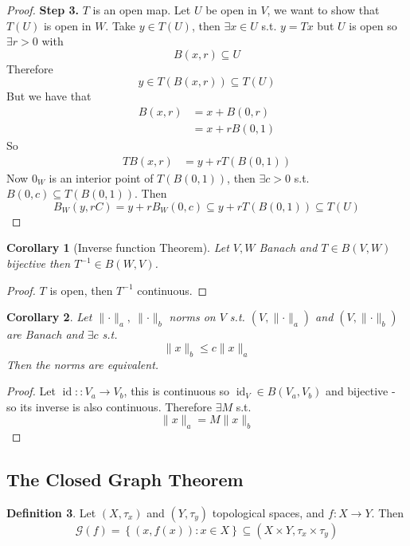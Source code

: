 \documentclass[11pt,a4paper]{article}
\theoremstyle{definition}
\newtheorem{definition}{Definition}[section]
\theoremstyle{plain}
\newtheorem{corollary}[definition]{Corollary}
\theoremstyle{remark}
\renewcommand{\set}[1]{\left\{ #1 \right\}}
\newcommand{\norm}[1]{\lVert #1 \rVert}
\newcommand{\1}{\mathbbm{1}}
\begin{document}
\begin{proof}
    \textbf{Step 3.} $T$ is an open map. Let $U$ be open in $V$, we want to show that $T(U)$ is open in $W$. Take $y \in T(U)$, then $\exists x \in U$ s.t. $y = Tx$ 
    but $U$ is open so $\exists r > 0$ with 
    $$B(x, r) \subseteq U$$
    Therefore 
    $$y \in T(B(x, r)) \subseteq T(U)$$
    But we have that 
    \begin{align*}
        B(x, r) &= x + B(0, r) \\
        &= x + r B(0, 1) 
    \end{align*}
    So 
    \begin{align*}
        TB(x, r) &= y + r T(B(0,1)) 
    \end{align*}
    Now $0_W$ is an interior point of $T(B(0,1))$, then $\exists c > 0$ s.t. $B(0, c) \subseteq T(B(0, 1))$. Then 
    $$B_W(y, rC)= y + rB_W(0, c) \subseteq y + rT (B(0, 1)) \subseteq T(U)$$ 
\end{proof}

\begin{corollary}[Inverse function Theorem]
    Let $V, W$ Banach and $T \in B(V,W)$ bijective then $T^{-1} \in B(W,V)$. 
\end{corollary}

\begin{proof}
    $T$ is open, then $T^{-1}$ continuous. 
\end{proof}

\begin{corollary}
    Let $\norm{\cdot}_a, \ \norm{\cdot}_b$ norms on $V$ s.t. $(V, \norm{\cdot}_a)$ and $(V, \norm{\cdot}_b)$ are Banach and $\exists c$ s.t. 
    $$\norm{x}_b \le c \norm{x}_a$$
    Then the norms are equivalent. 
\end{corollary}

\begin{proof}
    Let $\operatorname{id} \colon \colon V_a \to V_b$, this is continuous so $\operatorname{id}_V \in B(V_a, V_b)$ and bijective - so its inverse is also continuous. 
    Therefore $\exists M$ s.t. 
    $$\norm{x}_a = M \norm{x}_b$$     
\end{proof}

\subsection{The Closed Graph Theorem}

\begin{definition}
    Let $(X, \tau_x)$ and $(Y, \tau_y)$ topological spaces, and $f \colon X \to Y$. Then 
    $$\mathcal{G}(f) = \set{(x, f(x)) \colon x \in X} \subseteq (X \times Y, \tau_x \times \tau_y)$$
\end{definition}
\end{document}
